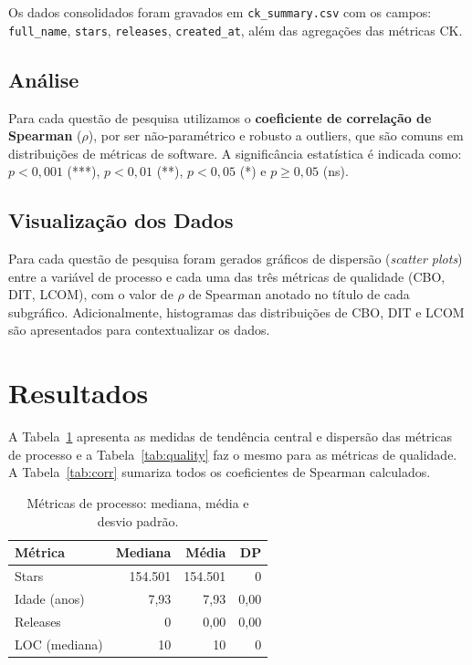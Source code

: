 \documentclass[10pt,a4paper,twocolumn]{article}
\begin{document}
Os dados consolidados foram gravados em \texttt{ck\_summary.csv} com os campos:
\texttt{full\_name}, \texttt{stars}, \texttt{releases},
\texttt{created\_at}, além das agregações das métricas CK.

\subsection{Análise}

Para cada questão de pesquisa utilizamos o \textbf{coeficiente de correlação
de Spearman} ($\rho$), por ser não-paramétrico e robusto a outliers, que são
comuns em distribuições de métricas de software.
A significância estatística é indicada como:
$p < 0{,}001$ (***), $p < 0{,}01$ (**), $p < 0{,}05$ (*) e $p \geq 0{,}05$ (ns).

\subsection{Visualização dos Dados}

Para cada questão de pesquisa foram gerados gráficos de dispersão
(\textit{scatter plots}) entre a variável de processo e cada uma das três
métricas de qualidade (CBO, DIT, LCOM), com o valor de $\rho$ de Spearman
anotado no título de cada subgráfico.
Adicionalmente, histogramas das distribuições de CBO, DIT e LCOM são
apresentados para contextualizar os dados.

\section{Resultados}

A Tabela~\ref{tab:process} apresenta as medidas de tendência central e dispersão
das métricas de processo e a Tabela~\ref{tab:quality} faz o mesmo para as
métricas de qualidade. A Tabela~\ref{tab:corr} sumariza todos os coeficientes
de Spearman calculados.

\begin{table}[H]
  \centering
  \caption{Métricas de processo: mediana, média e desvio padrão.}
  \label{tab:process}
  \begin{tabular}{lrrr}
    \toprule
    \textbf{Métrica} & \textbf{Mediana} & \textbf{Média} & \textbf{DP} \\
    \midrule
    Stars    & 154.501 & 154.501 & 0 \\
    Idade (anos) & 7,93 & 7,93 & 0,00 \\
    Releases & 0 & 0,00 & 0,00 \\
    LOC (mediana)& 10 & 10 & 0 \\
    \bottomrule
  \end{tabular}
\end{table}
\end{document}
